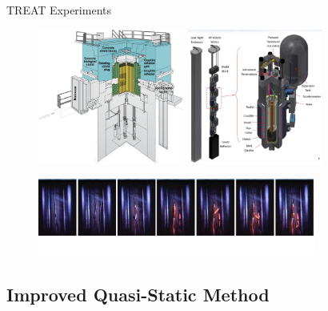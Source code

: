 \documentclass[8pt,xcolor=dvipnames]{beamer}
\begin{document}
\begin{frame}{TREAT Experiments}

\begin{figure}
\includegraphics[height=1.75in]{figures/Treat_cutaway.png}
\hspace{0.5in}
\includegraphics[height=1.75in]{figures/multi_sertta.png}
\end{figure}

\begin{figure}
\includegraphics[height=1in]{figures/Treat_melt.png}
\end{figure}

\end{frame}

\subsection{Improved Quasi-Static Method}
\end{document}
